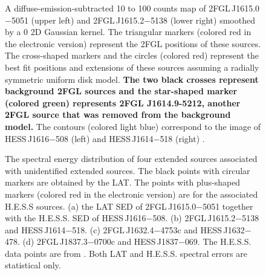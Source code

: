 \documentclass[12pt,preprint]{aastex}
\newif\ifcolorfigure
\newcommand{\gev}{\text{GeV}\xspace}
\newcommand{\tev}{\text{TeV}\xspace}
\newcommand{\newtext}[1]{{\bfseries \color{red}#1}}
\begin{document}
\begin{figure}
    \ifcolorfigure
      \plotone{source_plots/source_HESS_J1614-518_color.eps}
    \else
    \fi
  \caption{
    A diffuse-emission-subtracted 10 \gev to 100 \gev counts
    map of 2FGL\,J1615.0$-$5051 (upper left)
    and 2FGL\,J1615.2$-$5138 (lower right) smoothed by a 0
    2D Gaussian kernel.  The triangular markers (colored red in the
    electronic version) represent the 2FGL positions of these sources.
    The cross-shaped markers and the
    circles (colored red) represent the best fit
    positions and extensions of these sources assuming a radially
    symmetric uniform disk model.  
    \newtext{The two black crosses represent  background 2FGL sources and
    the star-shaped
    marker (colored green) represents 2FGL J1614.9-5212, another 2FGL
    source that was removed from the background
    model.} The contours (colored light blue) correspond to the \tev
    image of HESS\,J1616$-$508 (left) and HESS\,J1614$-$518 (right)
    \citep{hess_plane_survey}.   
    }\label{1FGL_J1613.6-5100c}
\end{figure}


\clearpage
\begin{figure}
    \ifcolorfigure
      \plotone{summary_plots/hess_seds_color.eps}
    \else
    \fi
    \caption{
    The spectral energy distribution of four extended
    sources associated with unidentified
    extended \tev sources.  The black points
    with circular markers are obtained by the LAT. The points with
    plus-shaped markers (colored red in the electronic version) are
    for the associated H.E.S.S sources.  (a) the
    LAT SED of 2FGL\,J1615.0$-$5051 together with the H.E.S.S. SED
    of HESS\,J1616$-$508. (b) 2FGL\,J1615.2$-$5138
    and HESS\,J1614$-$518. (c) 2FGL\,J1632.4$-$4753c
    and HESS\,J1632$-$478. (d) 2FGL\,J1837.3$-$0700c
    and HESS\,J1837$-$069. The H.E.S.S. data points are from
    \citep{hess_plane_survey}. Both LAT and H.E.S.S. spectral errors are
    statistical only.}
    \label{hess_seds}
  \end{figure}
\end{document}
